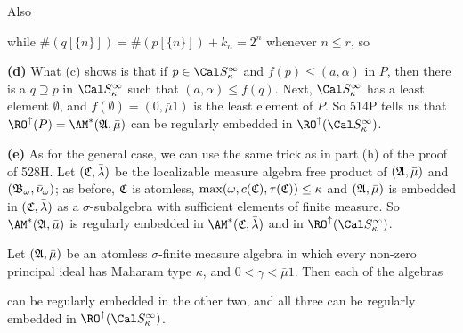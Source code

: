 {\noindent Also


\noindent while $\#(q[\{n\}])=\#(p[\{n\}])+k_n=2^n$ whenever $n\le r$,
so


\medskip

{\bf (d)} What (c) shows is that if $p\in\Cal S_{\kappa}^{\infty}$ and
$f(p)\le(a,\alpha)$ in $P$, then there is a $q\supseteq p$ in
$\Cal S_{\kappa}^{\infty}$ such that $(a,\alpha)\le f(q)$.
Next, $\Cal S^{\infty}_{\kappa}$ has a least element $\emptyset$, and
$f(\emptyset)=(0,\bar\mu 1)$ is the least element of $P$.   So 514P tells
us that
$\RO^{\uparrow}(P)=\AM^*(\frak A,\bar\mu)$ can be regularly embedded in
$\RO^{\uparrow}(\Cal S_{\kappa}^{\infty})$.

\medskip

{\bf (e)} As for the general case, we can use the same trick as in
part (h) of the proof of 528H.   Let $(\frak C,\bar\lambda)$ be the
localizable measure algebra free product of $(\frak A,\bar\mu)$ and
$(\frak B_{\omega},\bar\nu_{\omega})$;  as before, $\frak C$ is atomless,
$\max(\omega,c(\frak C),\tau(\frak C))\le\kappa$ and $(\frak A,\bar\mu)$
is embedded in $(\frak C,\bar\lambda)$ as a $\sigma$-subalgebra with
sufficient elements of finite measure.   So
$\AM^*(\frak A,\bar\mu)$ is regularly embedded in
$\AM^*(\frak C,\bar\lambda)$ and in
$\RO^{\uparrow}(\Cal S_{\kappa}^{\infty})$.
}%

 Let
$(\frak A,\bar\mu)$ be an atomless $\sigma$-finite measure algebra in which
every non-zero principal ideal has Maharam type $\kappa$,
and $0<\gamma<\bar\mu 1$.   Then each of the algebras


\noindent can be regularly embedded in the other two, and all three can
be regularly embedded in $\RO^{\uparrow}(\Cal S_{\kappa}^{\infty})$.

